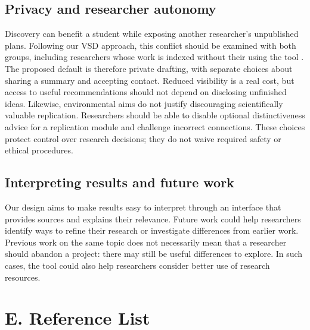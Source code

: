 \documentclass[11pt,a4paper]{article}
\begin{document}
\subsection*{Privacy and researcher autonomy}
Discovery can benefit a student while exposing another researcher's unpublished plans. Following our VSD approach, this conflict should be examined with both groups, including researchers whose work is indexed without their using the tool \citep{friedman2008}. The proposed default is therefore private drafting, with separate choices about sharing a summary and accepting contact. Reduced visibility is a real cost, but access to useful recommendations should not depend on disclosing unfinished ideas. Likewise, environmental aims do not justify discouraging scientifically valuable replication. Researchers should be able to disable optional distinctiveness advice for a replication module and challenge incorrect connections. These choices protect control over research decisions; they do not waive required safety or ethical procedures.

\subsection*{Interpreting results and future work}
Our design aims to make results easy to interpret through an interface that provides sources and explains their relevance. Future work could help researchers identify ways to refine their research or investigate differences from earlier work. Previous work on the same topic does not necessarily mean that a researcher should abandon a project: there may still be useful differences to explore. In such cases, the tool could also help researchers consider better use of research resources.


\clearpage
\section*{E. Reference List}
\end{document}
